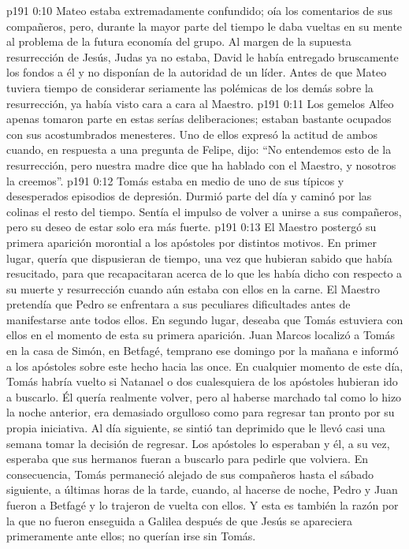 \vs p191 0:10 Mateo estaba extremadamente confundido; oía los comentarios de sus compañeros, pero, durante la mayor parte del tiempo le daba vueltas en su mente al problema de la futura economía del grupo. Al margen de la supuesta resurrección de Jesús, Judas ya no estaba, David le había entregado bruscamente los fondos a él y no disponían de la autoridad de un líder. Antes de que Mateo tuviera tiempo de considerar seriamente las polémicas de los demás sobre la resurrección, ya había visto cara a cara al Maestro.
\vs p191 0:11 Los gemelos Alfeo apenas tomaron parte en estas serías deliberaciones; estaban bastante ocupados con sus acostumbrados menesteres. Uno de ellos expresó la actitud de ambos cuando, en respuesta a una pregunta de Felipe, dijo: “No entendemos esto de la resurrección, pero nuestra madre dice que ha hablado con el Maestro, y nosotros la creemos”.
\vs p191 0:12 Tomás estaba en medio de uno de sus típicos y desesperados episodios de depresión. Durmió parte del día y caminó por las colinas el resto del tiempo. Sentía el impulso de volver a unirse a sus compañeros, pero su deseo de estar solo era más fuerte.
\vs p191 0:13 El Maestro postergó su primera aparición morontial a los apóstoles por distintos motivos. En primer lugar, quería que dispusieran de tiempo, una vez que hubieran sabido que había resucitado, para que recapacitaran acerca de lo que les había dicho con respecto a su muerte y resurrección cuando aún estaba con ellos en la carne. El Maestro pretendía que Pedro se enfrentara a sus peculiares dificultades antes de manifestarse ante todos ellos. En segundo lugar, deseaba que Tomás estuviera con ellos en el momento de esta su primera aparición. Juan Marcos localizó a Tomás en la casa de Simón, en Betfagé, temprano ese domingo por la mañana e informó a los apóstoles sobre este hecho hacia las once. En cualquier momento de este día, Tomás habría vuelto si Natanael o dos cualesquiera de los apóstoles hubieran ido a buscarlo. Él quería realmente volver, pero al haberse marchado tal como lo hizo la noche anterior, era demasiado orgulloso como para regresar tan pronto por su propia iniciativa. Al día siguiente, se sintió tan deprimido que le llevó casi una semana tomar la decisión de regresar. Los apóstoles lo esperaban y él, a su vez, esperaba que sus hermanos fueran a buscarlo para pedirle que volviera. En consecuencia, Tomás permaneció alejado de sus compañeros hasta el sábado siguiente, a últimas horas de la tarde, cuando, al hacerse de noche, Pedro y Juan fueron a Betfagé y lo trajeron de vuelta con ellos. Y esta es también la razón por la que no fueron enseguida a Galilea después de que Jesús se apareciera primeramente ante ellos; no querían irse sin Tomás.

